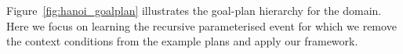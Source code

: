 Figure~\ref{fig:hanoi_goalplan} illustrates the goal-plan hierarchy for the domain. 
Here we focus on learning the recursive parameterised  event for which we remove the context conditions from the example plans and apply our framework.
%


